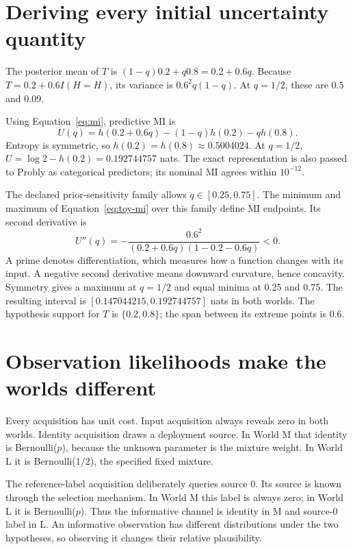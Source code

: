 \documentclass[11pt,a4paper]{report}
\begin{document}
\section{Deriving every initial uncertainty quantity}
The posterior mean of $T$ is $(1-q)0.2+q0.8=0.2+0.6q$. Because $T=0.2+0.6I(H=H)$, its variance is $0.6^2q(1-q)$. At $q=1/2$, these are $0.5$ and $0.09$.

Using Equation~\eqref{eq:mi}, predictive MI is
\begin{equation}
U(q)=h(0.2+0.6q)-(1-q)h(0.2)-qh(0.8).
\label{eq:toy-mi}
\end{equation}
Entropy is symmetric, so $h(0.2)=h(0.8)\approx0.5004024$. At $q=1/2$, $U=\log2-h(0.2)=0.192744757$ nats. The exact representation is also passed to Probly as categorical predictors; its nominal MI agrees within $10^{-12}$.

The declared prior-sensitivity family allows $q\in[0.25,0.75]$. The minimum and maximum of Equation~\eqref{eq:toy-mi} over this family define MI endpoints. Its second derivative is
\begin{equation}
U''(q)=-\frac{0.6^2}{(0.2+0.6q)(1-0.2-0.6q)}<0.
\end{equation}
A prime denotes differentiation, which measures how a function changes with its input. A negative second derivative means downward curvature, hence concavity. Symmetry gives a maximum at $q=1/2$ and equal minima at 0.25 and 0.75. The resulting interval is $[0.147044215,0.192744757]$ nats in both worlds. The hypothesis support for $T$ is $\{0.2,0.8\}$; the span between its extreme points is 0.6.

\section{Observation likelihoods make the worlds different}
Every acquisition has unit cost. Input acquisition always reveals zero in both worlds. Identity acquisition draws a deployment source. In World M that identity is Bernoulli($p$), because the unknown parameter is the mixture weight. In World L it is Bernoulli($1/2$), the specified fixed mixture.

The reference-label acquisition deliberately queries source 0. Its source is known through the selection mechanism. In World M this label is always zero; in World L it is Bernoulli($p$). Thus the informative channel is identity in M and source-0 label in L. An informative observation has different distributions under the two hypotheses, so observing it changes their relative plausibility.
\end{document}
